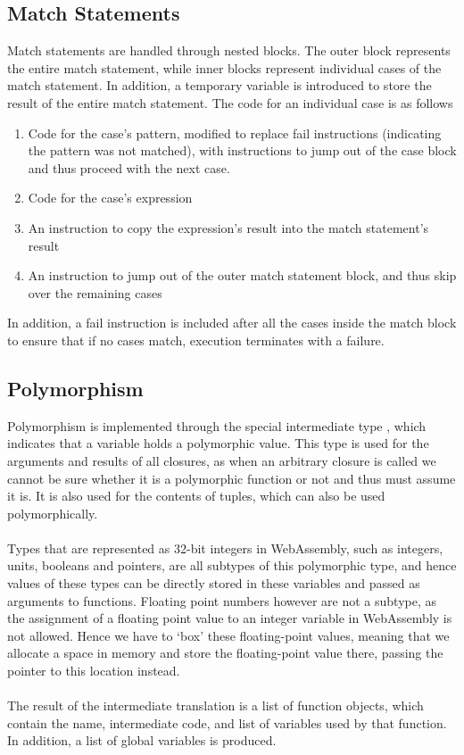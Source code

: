 \subsection{Match Statements}
Match statements are handled through nested blocks. The outer block represents the entire match statement, while inner blocks represent individual cases of the match statement. In addition, a temporary variable is introduced to store the result of the entire match statement. The code for an individual case is as follows
\begin{enumerate}
\item Code for the case's pattern, modified to replace fail instructions (indicating the pattern was not matched), with instructions to jump out of the case block and thus proceed with the next case.
\item Code for the case's expression
\item An instruction to copy the expression's result into the match statement's result
\item An instruction to jump out of the outer match statement block, and thus skip over the remaining cases
\end{enumerate}
In addition, a fail instruction is included after all the cases inside the match block to ensure that if no cases match, execution terminates with a failure.

\subsection{Polymorphism}
Polymorphism is implemented through the special intermediate type , which indicates that a variable holds a polymorphic value. This type is used for the arguments and results of all closures, as when an arbitrary closure is called we cannot be sure whether it is a polymorphic function or not and thus must assume it is. It is also used for the contents of tuples, which can also be used polymorphically. 
\\\\
Types that are represented as 32-bit integers in WebAssembly, such as integers, units, booleans and pointers, are all subtypes of this polymorphic type, and hence values of these types can be directly stored in these variables and passed as arguments to functions. Floating point numbers however are not a subtype, as the assignment of a floating point value to an integer variable in WebAssembly is not allowed. Hence we have to `box' these floating-point values, meaning that we allocate a space in memory and store the floating-point value there, passing the pointer to this location instead.
\\\\
The result of the intermediate translation is a list of function objects, which contain the name, intermediate code, and list of variables used by that function. In addition, a list of global variables is produced.





